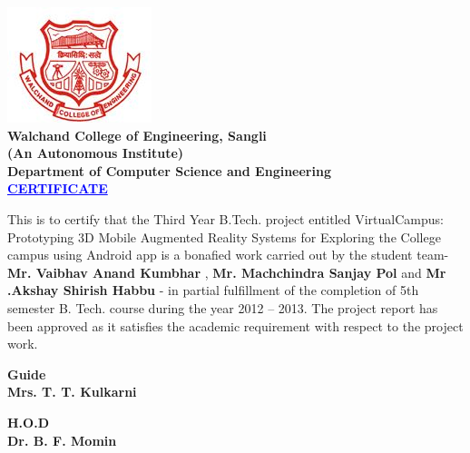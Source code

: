 \documentclass{article}
\begin{document}


\newpage
{	
\linespread{2}

	\begin{center}
		\includegraphics[width=.2\linewidth]{walchand.jpg}\\[.5cm]
		\textbf{\Large Walchand College of Engineering, Sangli }\\
		\textbf {(An Autonomous Institute)}\\[.5cm]
		 \textbf {\LARGE Department of Computer Science and Engineering}\\[1cm]
		\huge \textbf{\textcolor{blue}{\underline{CERTIFICATE}}}\\[1cm]
	\end{center}
	\linespread{1.6}
		\par \large This is to certify that the Third Year B.Tech. project entitled VirtualCampus: Prototyping 3D Mobile Augmented Reality Systems for Exploring the College campus using Android app is a bonafied work carried out by the student team- 
	\textbf{ Mr. Vaibhav Anand Kumbhar}  , \textbf{ Mr. Machchindra Sanjay Pol } and \textbf{  Mr .Akshay Shirish Habbu }  - 
in partial fulfillment of the completion of 5th semester B. Tech. course during the year 2012 – 2013. The project report has been approved as it satisfies the academic requirement with respect to the project work.\\[2cm]
\vspace{6cm}
\begin{minipage}{.5\linewidth}
	\begin{flushleft}
		\textbf{Guide}\\
		\textbf{Mrs. T. T. Kulkarni}\\
	\end{flushleft}
\end{minipage}
\begin{minipage}{.5\linewidth}
	\begin{flushright}
	
	\textbf{H.O.D}\\
	\textbf{Dr. B. F. Momin}\\
	\end{flushright}
\end{minipage}


}
\end{document}
